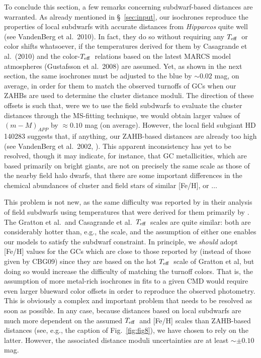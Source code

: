 \documentclass[12pt,preprint]{aastex}
\newcommand\teff{{T_{\rm eff}}}
\begin{document}
To conclude this section, a few remarks concerning subdwarf-based distances are
warranted.  As already mentioned in \S~\ref{sec:input}, our isochrones reproduce
the properties of local subdwarfs with accurate distances from {\it Hipparcos}
quite well (see VandenBerg et al.~2010).  In fact, they do so without requiring
any $\teff$\ or color shifts whatsoever, if the temperatures derived for them by
Casagrande et al.~(2010) and the color-$\teff$\ relations based on the latest
MARCS model atmospheres (Gustafsson et al.~2008) are assumed.  Yet, as shown in
the next section, the same isochrones must be adjusted to the blue by $\sim
0.02$ mag, on average, in order for them to match the observed turnoffs of GCs
when our ZAHBs are used to determine the cluster distance moduli.  The
direction of these offsets is such that, were we to use the field subdwarfs to
evaluate the cluster distances through the MS-fitting technique, we would
obtain larger values of $(m-M)_{APP}$ by $\approx 0.10$ mag (on average).
However, the local field subgiant HD$\,$140283 suggests that, if anything, our
ZAHB-based distances are already too high (see VandenBerg et al.~2002,
\citealt{bnv13}).  This apparent inconsistency has yet to be resolved, though
it may indicate, for instance, that GC metallicities, which are based primarily
on bright giants, are not on precisely the same scale as those of the nearby
field halo dwarfs, that there are some important differences in the chemical
abundances of cluster and field stars of similar [Fe/H], or $\ldots$

This problem is not new, as the same difficulty was reported by \citet{bv01}
in their analysis of field subdwarfs using temperatures that were derived for
them primarily by \citet{gcc96}.  The Gratton et al.~and Casagrande et
al.~$\teff$\ scales are quite similar: both are considerably hotter than, e.g.,
the \citet{aam96} scale, and the assumption of either one enables our models to
satisfy the subdwarf constraint.  In principle, we {\it should} adopt [Fe/H]
values for the GCs which are close to those reported by \citet{cg97} (instead
of those given by CBG09) since they are based on the hot $\teff$\ scale of
Gratton et al, but doing so would increase the difficulty of matching the 
turnoff colors.  That is, the assumption of more metal-rich isochrones in fits
to a given CMD would require even larger blueward color offsets in order to
reproduce the observed photometry.  This is obviously a complex and important
problem that needs to be resolved as soon as possible.  In any case, because
distances based on local subdwarfs are much more dependent on the assumed
$\teff$\ and [Fe/H] scales than ZAHB-based distances (see, e.g., the caption of
Fig.~\ref{fig:fig8}), we have chosen to rely on the latter.  However, the
associated distance moduli uncertainties are at least $\sim \pm 0.10$ mag.
\end{document}
